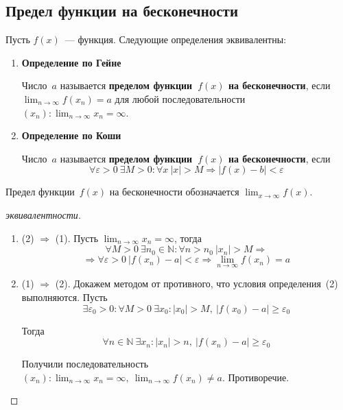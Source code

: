 \subsection{Предел функции на бесконечности}
Пусть $f(x)$~--- функция.
Следующие определения эквивалентны:
\begin{enumerate}
	\item \textbf{Определение по Гейне}
	
	Число~$a$ называется \textbf{пределом функции~$f(x)$ на бесконечности}, если $\displaystyle \lim_{n \to \infty} f(x_n) = a$ для любой последовательности~$\displaystyle (x_n): \lim_{n \to \infty} x_n = \infty$.
	
	\item \textbf{Определение по Коши}
	
	Число~$a$ называется \textbf{пределом функции~$f(x)$ на бесконечности}, если
	\begin{equation*}
	\forall \varepsilon > 0 \ \exists M > 0 \colon \forall x \ |x| > M \Rightarrow |f(x) - b| < \varepsilon
	\end{equation*}
\end{enumerate}

Предел функции~$f(x)$ на бесконечности обозначается $\displaystyle \lim_{x \to \infty} f(x)$.
\begin{proof}[эквивалентности]
\begin{enumerate}
	\item (2) $\Rightarrow$ (1).
	Пусть $\displaystyle \lim_{n \to \infty} x_n = \infty$, тогда
	\begin{equation*}
	\forall M > 0 \ \exists n_0 \in \mathbb N \colon \forall n > n_0 \ |x_n| > M \Rightarrow
	\end{equation*}
	\begin{equation*}
	\Rightarrow \forall \varepsilon > 0 \ |f(x_n) - a| < \varepsilon \Rightarrow
	\lim_{n \to \infty} f(x_n) = a
	\end{equation*}
	
	\item (1) $\Rightarrow$ (2).
	Докажем методом от противного, что условия определения~(2) выполняются.
	Пусть
	\begin{equation*}
	\exists \varepsilon_0 > 0 \colon \forall M > 0 \ \exists x_0 \colon |x_0| > M, \ |f(x_0) - a| \geqslant \varepsilon_0
	\end{equation*}
	
	Тогда
	\begin{equation*}
	\forall n \in \mathbb N \ \exists x_n \colon |x_n| > n, \ |f(x_n) - a| \geqslant \varepsilon_0
	\end{equation*}
	
	Получили последовательность $\displaystyle (x_n) \colon \lim_{n \to \infty} x_n = \infty, \ \lim_{n \to \infty} f(x_n) \neq a$.
	Противоречие.
\end{enumerate}
\end{proof}

